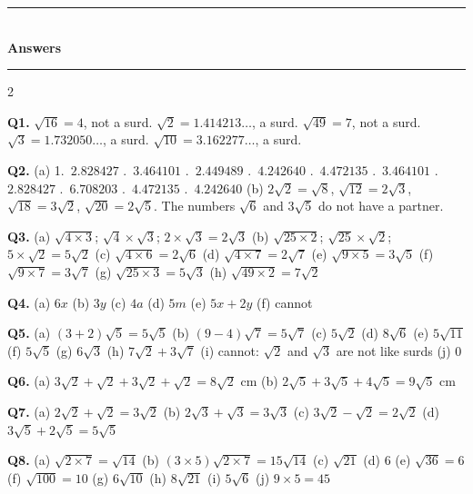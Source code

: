 \documentclass[12pt,a4paper]{article}
\newcommand{\heading}[1]{%
  \vspace{2pt}
  {\color{blue!45!black}\rule{\linewidth}{1pt}}\\[1pt]
  {\large\bfseries #1}\\[-6pt]
  {\color{blue!45!black}\rule{\linewidth}{0.4pt}}
  \vspace{2pt}}
\newcommand{\ealkey}[1]{\textcolor{ealkeycolour}{#1}}
\begin{document}
\newpage

\heading{Answers}

{\small
\begin{multicols}{2}
\raggedcolumns
\setlength{\parskip}{4pt}

\textbf{Q1.} $\sqrt{16}=4$, not a \ealkey{surd}. \quad $\sqrt{2}=1.414213\ldots$, a
\ealkey{surd}. \quad $\sqrt{49}=7$, not a \ealkey{surd}. \quad $\sqrt{3}=1.732050\ldots$, a
\ealkey{surd}. \quad $\sqrt{10}=3.162277\ldots$, a \ealkey{surd}.

\textbf{Q2.} (a) 1.~$2.828427$ .~$3.464101$ .~$2.449489$ .~$4.242640$ .~$4.472135$ .~$3.464101$ .~$2.828427$
.~$6.708203$ .~$4.472135$ .~$4.242640$ \quad
(b) $2\sqrt{2}=\sqrt{8}$, \; $\sqrt{12}=2\sqrt{3}$, \; $\sqrt{18}=3\sqrt{2}$,
\; $\sqrt{20}=2\sqrt{5}$. The numbers $\sqrt{6}$ and $3\sqrt{5}$ do not have
a partner.

\textbf{Q3.} (a) $\sqrt{4\times3}$; \; $\sqrt{4}\times\sqrt{3}$; \;
$2\times\sqrt{3}=2\sqrt{3}$ \quad (b) $\sqrt{25\times2}$; \;
$\sqrt{25}\times\sqrt{2}$; \; $5\times\sqrt{2}=5\sqrt{2}$ \quad
(c) $\sqrt{4\times6}=2\sqrt{6}$ \quad (d) $\sqrt{4\times7}=2\sqrt{7}$ \quad
(e) $\sqrt{9\times5}=3\sqrt{5}$ \quad (f) $\sqrt{9\times7}=3\sqrt{7}$ \quad
(g) $\sqrt{25\times3}=5\sqrt{3}$ \quad (h) $\sqrt{49\times2}=7\sqrt{2}$

\textbf{Q4.} (a) $6x$ \quad (b) $3y$ \quad (c) $4a$ \quad (d) $5m$ \quad
(e) $5x+2y$ \quad (f) cannot

\textbf{Q5.} (a) $(3+2)\sqrt{5}=5\sqrt{5}$ \quad
(b) $(9-4)\sqrt{7}=5\sqrt{7}$ \quad (c) $5\sqrt{2}$ \quad (d) $8\sqrt{6}$
\quad (e) $5\sqrt{11}$ \quad (f) $5\sqrt{5}$ \quad (g) $6\sqrt{3}$ \quad
(h) $7\sqrt{2}+3\sqrt{7}$ \quad (i) cannot: $\sqrt{2}$ and $\sqrt{3}$ are not
\ealkey{like surds} \quad (j) $0$

\textbf{Q6.} (a) $3\sqrt{2}+\sqrt{2}+3\sqrt{2}+\sqrt{2}=8\sqrt{2}$ cm \quad
(b) $2\sqrt{5}+3\sqrt{5}+4\sqrt{5}=9\sqrt{5}$ cm

\textbf{Q7.} (a) $2\sqrt{2}+\sqrt{2}=3\sqrt{2}$ \quad
(b) $2\sqrt{3}+\sqrt{3}=3\sqrt{3}$ \quad
(c) $3\sqrt{2}-\sqrt{2}=2\sqrt{2}$ \quad
(d) $3\sqrt{5}+2\sqrt{5}=5\sqrt{5}$

\textbf{Q8.} (a) $\sqrt{2\times7}=\sqrt{14}$ \quad
(b) $(3\times5)\sqrt{2\times7}=15\sqrt{14}$ \quad (c) $\sqrt{21}$ \quad
(d) $6$ \quad (e) $\sqrt{36}=6$ \quad (f) $\sqrt{100}=10$ \quad
(g) $6\sqrt{10}$ \quad (h) $8\sqrt{21}$ \quad (i) $5\sqrt{6}$ \quad
(j) $9\times5=45$


\end{multicols}}
\end{document}

